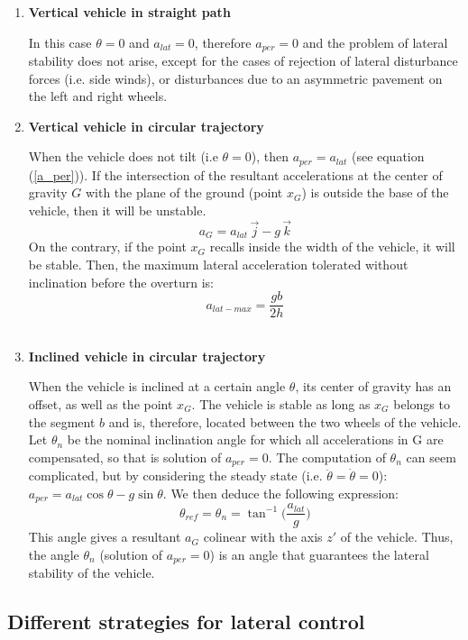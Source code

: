\begin{enumerate}
\item \textbf{Vertical vehicle in straight path}

In this case $\theta=0$ and $a_{lat}=0$, therefore $a_{per}=0$ and the problem of lateral stability does not arise, except for the cases of rejection of lateral disturbance forces (i.e. side winds), or disturbances due to an asymmetric pavement on the left and right wheels. 

\item \textbf{Vertical vehicle in circular trajectory}

When the vehicle does not tilt (i.e $\theta=0$), then $a_{per}=a_{lat}$ (see equation (\ref{a_per})). If the intersection of the resultant accelerations at the center of gravity $G$ with the plane of the ground (point $x_G$) is outside the base of the vehicle, then it will be unstable. 
\[a_{G}=a_{lat}\,\vec{j} -g\,\vec{k}\]
On the contrary, if the point $x_G$ recalls inside the width of the vehicle, it will be stable. Then, the maximum lateral acceleration tolerated without inclination before the overturn is:
\begin{equation}
a_{lat-max}=\frac{gb}{2h}
\end{equation}
\\[-1cm]
\item \textbf{Inclined vehicle in circular trajectory}

When the vehicle is inclined at a certain angle $\theta$, its center of gravity has an offset, as well as the point $x_G$. The vehicle is stable as long as $x_G$ belongs to the segment $b$ and is, therefore, located between the two wheels of the vehicle. Let $\theta_n$ be the nominal inclination angle for which all accelerations in G are compensated, so that is solution of $a_{per}=0$. The computation of $\theta_n$ can seem complicated, but by considering the steady state (i.e. $\ddot{\theta}=\dot{\theta}=0$): $a_{per}=a_{lat}\cos\theta-g\sin\theta$. We then deduce the following expression:
\[\theta_{ref}=\theta_{n}=\tan^{-1}\Big(\frac{a_{lat}}{g}\Big)\]
This angle gives a resultant $a_{G}$ colinear with the axis $z'$ of the vehicle. Thus, the angle $\theta_{n}$ (solution of $a_{per}=0$) is an angle that guarantees the lateral stability of the vehicle.
\end{enumerate}

\subsection{Different strategies for lateral control}

